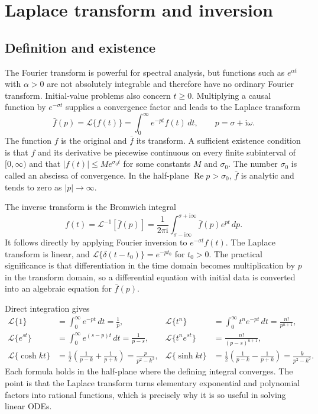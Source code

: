 \section{Laplace transform and inversion}

\subsection{Definition and existence}

The Fourier transform is powerful for spectral analysis, but functions such as $e^{\alpha t}$ with $\alpha>0$ are not absolutely integrable and therefore have no ordinary Fourier transform. Initial-value problems also concern $t\geq0$. Multiplying a causal function by $e^{-\sigma t}$ supplies a convergence factor and leads to the Laplace transform
\begin{equation}
\bar f(p)=\mathcal{L}\{f(t)\}=\int_0^\infty e^{-pt}f(t)\,dt,
\qquad p=\sigma+\mathrm{i}\omega.
\end{equation}
The function $f$ is the original and $\bar f$ its transform. A sufficient existence condition is that $f$ and its derivative be piecewise continuous on every finite subinterval of $[0,\infty)$ and that $|f(t)|\leq Me^{\sigma_0t}$ for some constants $M$ and $\sigma_0$. The number $\sigma_0$ is called an abscissa of convergence. In the half-plane $\operatorname{Re}p>\sigma_0$, $\bar f$ is analytic and tends to zero as $|p|\to\infty$.

The inverse transform is the Bromwich integral
\begin{equation}
f(t)=\mathcal{L}^{-1}[\bar f(p)]
=\frac{1}{2\pi\mathrm{i}}\int_{\sigma-\mathrm{i}\infty}^{\sigma+\mathrm{i}\infty}
\bar f(p)e^{pt}\,dp.
\label{eq:ch05-bromwich}
\end{equation}
It follows directly by applying Fourier inversion to $e^{-\sigma t}f(t)$. The Laplace transform is linear, and $\mathcal{L}\{\delta(t-t_0)\}=e^{-pt_0}$ for $t_0>0$. The practical significance is that differentiation in the time domain becomes multiplication by $p$ in the transform domain, so a differential equation with initial data is converted into an algebraic equation for $\bar f(p)$.

\begin{example}
Direct integration gives
\begin{align}
\mathcal{L}\{1\}&=\int_0^\infty e^{-pt}\,dt=\frac{1}{p}, &
\mathcal{L}\{t^n\}&=\int_0^\infty t^n e^{-pt}\,dt=\frac{n!}{p^{n+1}},\\
\mathcal{L}\{e^{st}\}&=\int_0^\infty e^{(s-p)t}\,dt=\frac{1}{p-s}, &
\mathcal{L}\{t^ne^{st}\}&=\frac{n!}{(p-s)^{n+1}},\\
\mathcal{L}\{\cosh kt\}&=\frac12\left(\frac{1}{p-k}+\frac{1}{p+k}\right)=\frac{p}{p^2-k^2}, &
\mathcal{L}\{\sinh kt\}&=\frac12\left(\frac{1}{p-k}-\frac{1}{p+k}\right)=\frac{k}{p^2-k^2}.
\end{align}
Each formula holds in the half-plane where the defining integral converges. The point is that the Laplace transform turns elementary exponential and polynomial factors into rational functions, which is precisely why it is so useful in solving linear ODEs.
\end{example}

